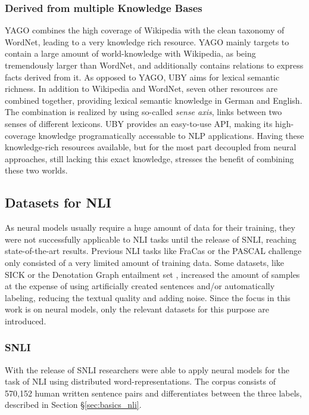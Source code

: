 \subsubsection{Derived from multiple Knowledge Bases}
\ac{YAGO} \citep{suchanek2007yago} combines the high coverage of Wikipedia with the clean taxonomy of WordNet, leading to a very knowledge rich resource. \ac{YAGO} mainly targets to contain a large amount of world-knowledge with Wikipedia, as being tremendously larger than WordNet, and additionally contains relations to express facts derived from it. As opposed to \ac{YAGO}, UBY \citep{gurevych2012uby} aims for lexical semantic richness. In addition to Wikipedia and WordNet, seven other resources are combined together, providing lexical semantic knowledge in German and English. The combination is realized by using so-called \textit{sense axis}, links between two senses of different lexicons. UBY provides an easy-to-use API, making its high-coverage knowledge programatically accessable to \ac{NLP} applications. Having these knowledge-rich resources available, but for the most part decoupled from neural approaches, still lacking this exact knowledge, stresses the benefit of combining these two worlds. 

\subsection{Datasets for NLI}\label{sec:basics_datasets}
As neural models usually require a huge amount of data for their training, they were not successfully applicable to \ac{NLI} tasks until the release of \ac{SNLI}, reaching state-of-the-art results. Previous \ac{NLI} tasks like FraCas \citep{cooper1996using} or the PASCAL challenge \citep{dagan2006pascal} only consisted of a very limited amount of training data. Some datasets, like \ac{SICK} \citep{marelli2014semeval} or the Denotation Graph entailment set \citep{young2014image}, increased the amount of samples at the expense of using artificially created sentences and/or automatically labeling, reducing the textual quality and adding noise. Since the focus in this work is on neural models, only the relevant datasets for this purpose are introduced.
\subsubsection{SNLI}\label{sec:snli}
With the release of \ac{SNLI} \citep{bowman2015large} researchers were able to apply neural models for the task of \ac{NLI} using distributed word-representations. The corpus consists of 570,152 human written sentence pairs and differentiates between the three labels, described in Section §\ref{sec:basics_nli}. 
